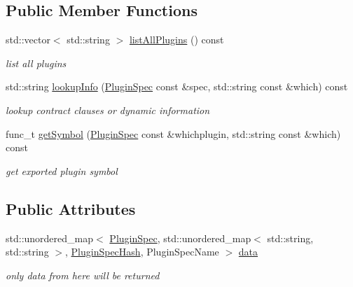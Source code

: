\subsection*{Public Member Functions}
\begin{DoxyCompactItemize}
\item 
std\+::vector$<$ std\+::string $>$ \mbox{\hyperlink{classkdb_1_1tools_1_1MockPluginDatabase_a3663848683953bfad7123c48c00ab404}{list\+All\+Plugins}} () const
\begin{DoxyCompactList}\small\item\em list all plugins \end{DoxyCompactList}\item 
std\+::string \mbox{\hyperlink{classkdb_1_1tools_1_1MockPluginDatabase_ae352c27aa51bc8c2ea8c708d14f6fc76}{lookup\+Info}} (\mbox{\hyperlink{classkdb_1_1tools_1_1PluginSpec}{Plugin\+Spec}} const \&spec, std\+::string const \&which) const
\begin{DoxyCompactList}\small\item\em lookup contract clauses or dynamic information \end{DoxyCompactList}\item 
func\+\_\+t \mbox{\hyperlink{classkdb_1_1tools_1_1MockPluginDatabase_a5a701fd310be0e9f7d14a865c0226517}{get\+Symbol}} (\mbox{\hyperlink{classkdb_1_1tools_1_1PluginSpec}{Plugin\+Spec}} const \&whichplugin, std\+::string const \&which) const
\begin{DoxyCompactList}\small\item\em get exported plugin symbol \end{DoxyCompactList}\end{DoxyCompactItemize}
\subsection*{Public Attributes}
\begin{DoxyCompactItemize}
\item 
std\+::unordered\+\_\+map$<$ \mbox{\hyperlink{classkdb_1_1tools_1_1PluginSpec}{Plugin\+Spec}}, std\+::unordered\+\_\+map$<$ std\+::string, std\+::string $>$, \mbox{\hyperlink{structkdb_1_1tools_1_1PluginSpecHash}{Plugin\+Spec\+Hash}}, Plugin\+Spec\+Name $>$ \mbox{\hyperlink{classkdb_1_1tools_1_1MockPluginDatabase_a5de7756d9e7fb78d53903c92208d7fbe}{data}}
\begin{DoxyCompactList}\small\item\em only data from here will be returned \end{DoxyCompactList}\end{DoxyCompactItemize}

